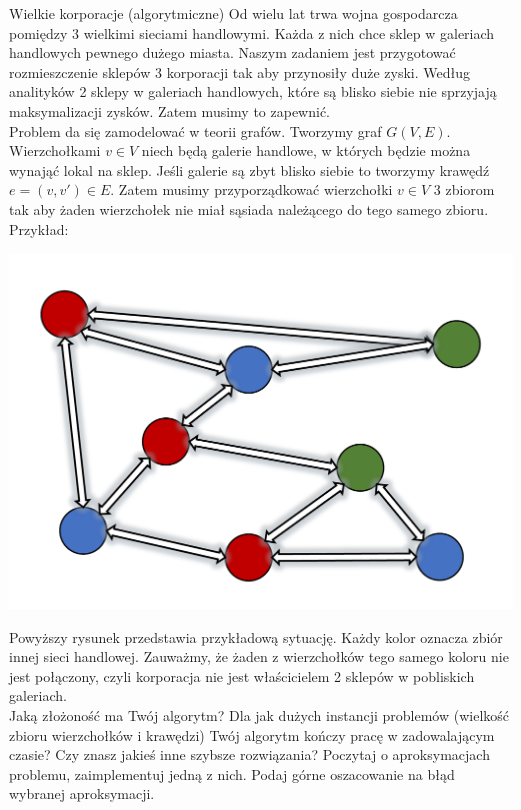 \begin{exercise}{Wielkie korporacje (algorytmiczne)}{}
Od wielu lat trwa wojna gospodarcza pomiędzy 3 wielkimi sieciami handlowymi. Każda z nich chce sklep w galeriach handlowych pewnego dużego miasta. Naszym zadaniem jest przygotować rozmieszczenie sklepów 3 korporacji tak aby przynosiły duże zyski. Według analityków 2 sklepy w galeriach handlowych, które są blisko siebie nie sprzyjają maksymalizacji zysków. Zatem musimy to zapewnić. \\

Problem da się zamodelować w teorii grafów. Tworzymy graf $G(V,E)$. Wierzchołkami $v \in V$ niech będą galerie handlowe, w których będzie można wynająć lokal na sklep. Jeśli galerie są zbyt blisko siebie to tworzymy krawędź $e=(v,v') \in E$.
Zatem musimy przyporządkować wierzchołki $v \in V$ 3 zbiorom tak aby żaden wierzchołek nie miał sąsiada należącego do tego samego zbioru. \\

Przykład:
\begin{center}
\includegraphics[scale=0.3]{Rysunki/zad23.pdf}
\end{center}

Powyższy rysunek przedstawia przykładową sytuację. Każdy kolor oznacza zbiór innej sieci handlowej. Zauważmy, że żaden z wierzchołków tego samego koloru nie jest połączony, czyli korporacja nie jest właścicielem 2 sklepów w pobliskich galeriach.\\

Jaką złożoność ma Twój algorytm? Dla jak dużych instancji problemów (wielkość zbioru wierzchołków i krawędzi) Twój algorytm kończy pracę w zadowalającym czasie? Czy znasz jakieś inne szybsze rozwiązania? Poczytaj o aproksymacjach problemu, zaimplementuj jedną z nich. Podaj górne oszacowanie na błąd wybranej aproksymacji.
\end{exercise}

